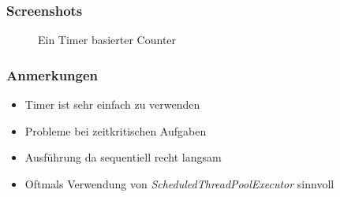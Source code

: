 \begin{frame}
   \frametitle{Screenshots}
	\begin{figure}[h!]
	  \centering
	  \hfill
	  \caption{
		  Ein Timer basierter Counter
	  }
	  \label{fig:timer}
	\end{figure}
\end{frame}

\begin{frame}
   \frametitle{Anmerkungen}
   \begin{itemize}
     	\item Timer ist sehr einfach zu verwenden
     	\item Probleme bei zeitkritischen Aufgaben
     	\item Ausführung da sequentiell recht langsam
     	\item Oftmals Verwendung von \emph{ScheduledThreadPoolExecutor} sinnvoll
   \end{itemize}
\end{frame}

